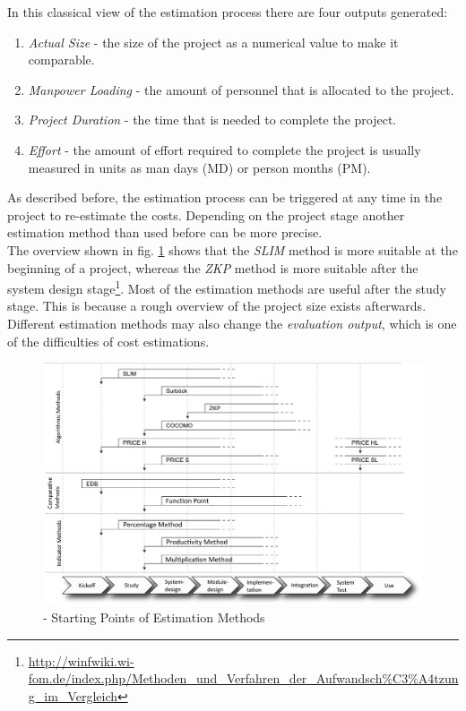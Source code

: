 In this classical view of the estimation process there are four outputs generated:
\begin{enumerate}
	\item \textit{Actual Size} - the size of the project as a numerical value to make it comparable.
	\item \textit{Manpower Loading} - the amount of personnel that is allocated to the project.
	\item \textit{Project Duration} - the time that is needed to complete the project.
	\item \textit{Effort} - the amount of effort required to complete the project is usually measured in units as man days (MD) or person months (PM).
\end{enumerate}
As described before, the estimation process can be triggered at any time in the project to re-estimate the costs. Depending on the project stage another estimation method than used before can be more precise.\\
The overview shown in fig. \ref{fig:estimationMethodInStage} shows that the \textit{SLIM} method is more suitable at the beginning of a project, whereas the \textit{ZKP} method is more suitable after the system design stage\footnote{\url{http://winfwiki.wi-fom.de/index.php/Methoden_und_Verfahren_der_Aufwandsch\%C3\%A4tzung_im_Vergleich}}. Most of the estimation methods are useful after the study stage. This is because a rough overview of the project size exists afterwards. Different estimation methods may also change the \textit{evaluation output}, which is one of the difficulties of cost estimations.\\
\begin{figure}[h] 
	\centering 
	\includegraphics[width=13cm]{images/Einsatzzeitpunkte2.PNG} 
	\caption{- Starting Points of Estimation Methods} 
	\label{fig:estimationMethodInStage}
\end{figure}

